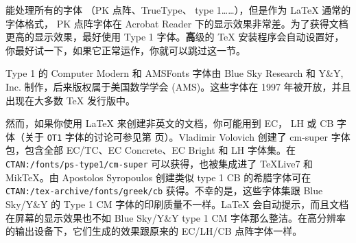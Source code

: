 
 能处理所有的字体 （PK 点阵、TrueType、 \PSi{}
type 1……），但是作为 \LaTeX{} 通常的字体格式， PK 点阵字体在 Acrobat
Reader 下的显示效果非常差。为了获得文档更高的显示效果，最好使用 \PSi{}
Type 1 字体。{\textbf
高级的 \TeX{} 安装程序会自动设置好，你最好试一下，如果它正常运作，你就可以跳过这一节。}


\PSi{} Type 1 的 Computer Modern 和 AMSFonts 字体由 Blue Sky
Research 和 Y\&Y,
Inc. 制作，后来版权属于美国数学学会 (AMS)。这些字体在 1997 年被开放，并且出现在大多数 \TeX{} 发行版中。


然而，如果你使用 \LaTeX{} 来创建非英文的文档，你可能用到 EC， LH 或 CB 字体（关于
 \texttt{OT1} 字体的讨论可参见第 \pageref{OT1} 页）。Vladimir
Volovich 创建了 cm-super 字体包，包含全部 EC/TC、EC Concrete、EC
Bright 和 LH 字体集。在 \texttt{CTAN:/fonts/ps-type1/cm-super} 可以获得，也被集成进了
 \TeX{}Live7 和 Mik\TeX\/。由 Apostolos Syropoulos 创建类似 type 1
CB 的希腊字体可在 \texttt{CTAN:/tex-archive/fonts/greek/cb} 获得。不幸的是，这些字体集跟 Blue
Sky/Y\&Y 的 Type 1
CM 字体的印刷质量不一样。\LaTeX{} 会自动提示，而且文档在屏幕的显示效果也不如 Blue
Sky/Y\&Y type 1
CM 字体那么整洁。在高分辨率的输出设备下，它们生成的效果跟原来的 EC/LH/CB 点阵字体一样。

